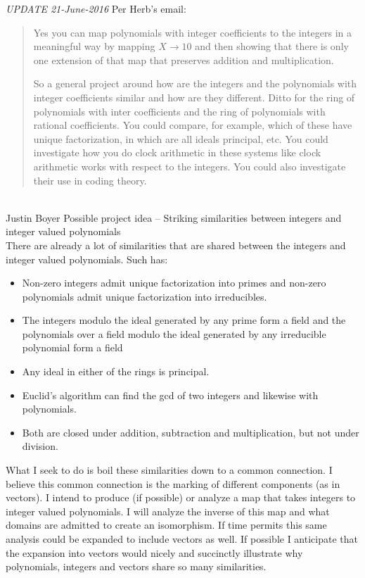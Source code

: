 \documentclass[12pt]{article}
\begin{document}
\emph{UPDATE 21-June-2016}
Per Herb's email:
\begin{quote}
Yes you can map polynomials with integer coefficients to the integers in a meaningful way by mapping 
$X \rightarrow 10$ and then showing that there is only one extension of that map that preserves addition and multiplication.

So a general project around how are the integers and the polynomials with integer coefficients similar and how are they different.  Ditto for the ring of polynomials with inter coefficients and the ring of polynomials with rational coefficients.  You could compare, for example, which of these have unique factorization, in which are all ideals principal, etc.  You could investigate how you do clock arithmetic in these systems like clock arithmetic works with respect to the integers.  You could also investigate their use in coding theory.
\end{quote}

\mbox{}\\

Justin Boyer
Possible project idea -- Striking similarities between integers and integer valued polynomials\\

There are already a lot of similarities that are shared between the integers and integer valued polynomials.  Such has:
\begin{itemize}
\item Non-zero integers admit unique factorization into primes and non-zero polynomials admit unique factorization into irreducibles.
\item The integers modulo the ideal generated by any prime form a field and the polynomials over a field modulo the ideal generated by any irreducible polynomial form a field
\item Any ideal in either of the rings is principal.
\item Euclid's algorithm can find the gcd of two integers and likewise with polynomials.
\item Both are closed under addition, subtraction and multiplication, but not under division.
\end{itemize}


What I seek to do is boil these similarities down to a common connection.  I believe this common connection is the marking of different components (as in vectors).  I intend to produce (if possible) or analyze a map that takes  integers to integer valued polynomials.  I will analyze the inverse of this map and what domains are admitted to create an isomorphism. If time permits this same analysis could be expanded to include vectors as well.  If possible I anticipate that the expansion into vectors would nicely and succinctly illustrate why polynomials, integers and vectors share so many similarities.  
\end{document}
